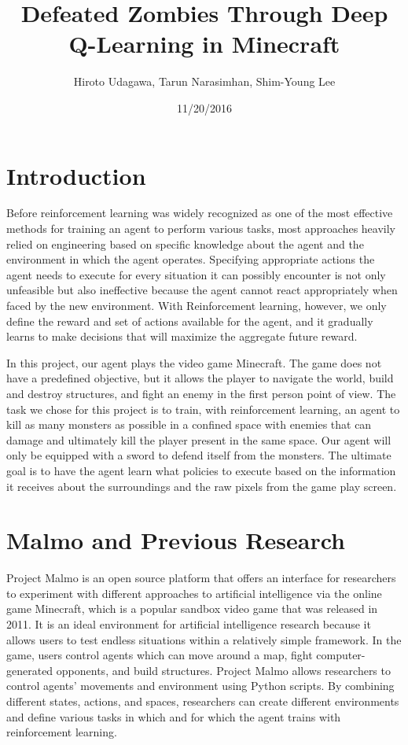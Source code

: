 \documentclass{article}
\title{Defeated Zombies Through Deep Q-Learning in Minecraft}
\author{Hiroto Udagawa, Tarun Narasimhan, Shim-Young Lee}
\date{11/20/2016}
\begin{document}
\maketitle

\section{Introduction}

Before reinforcement learning was widely recognized as one of the most effective methods for training an agent to perform various tasks, most approaches heavily relied on engineering based on specific knowledge about the agent and the environment in which the agent operates. Specifying appropriate actions the agent needs to execute for every situation it can possibly encounter is not only unfeasible but also ineffective because the agent cannot react appropriately when faced by the new environment. With Reinforcement learning, however, we only define the reward and set of actions available for the agent, and it gradually learns to make decisions that will maximize the aggregate future reward. 

In this project, our agent plays the video game Minecraft. The game does not have a predefined objective, but it allows the player to navigate the world, build and destroy structures, and fight an enemy in the first person point of view. The task we chose for this project is to train, with reinforcement learning, an agent to kill as many monsters as possible in a confined space with enemies that can damage and ultimately kill the player present in the same space. Our agent will only be equipped with a sword to defend itself from the monsters. The ultimate goal is to have the agent learn what policies to execute based on the information it receives about the surroundings and the raw pixels from the game play screen.

\section{Malmo and Previous Research}

Project Malmo is an open source platform that offers an interface for researchers to experiment with different approaches to artificial intelligence via the online game Minecraft, which is a popular sandbox video game that was released in 2011. It is an ideal environment for artificial intelligence research because it allows users to test endless situations within a relatively simple framework. In the game, users control agents which can move around a map, fight computer-generated opponents, and build structures. Project Malmo allows researchers to control agents' movements and environment using Python scripts. By combining different states, actions, and spaces, researchers can create different environments and define various tasks in which and for which the agent trains with reinforcement learning.
\end{document}
